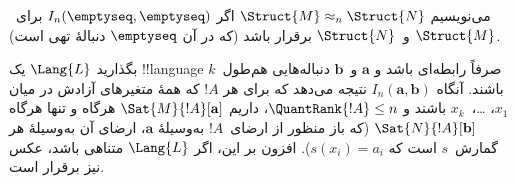 \documentclass[../../../include/open-logic-section]{subfiles}
\begin{document}
\begin{defn}
  می‌نویسیم $\Struct{M} \approx_n \Struct{N}$ اگر
  $I_n(\emptyseq,\emptyseq)$ برای~$\Struct{M}$ و~$\Struct{N}$ برقرار
  باشد (که در آن $\emptyseq$ دنبالهٔ تهی است).
\end{defn}

\begin{thm}
  بگذارید $\Lang{L}$ یک !!{language} صرفاً رابطه‌ای باشد و
  $\mathbf a$ و~$\mathbf b$ دنباله‌هایی هم‌طول~$k$ باشند. آنگاه
  $I_n (\mathbf{a},\mathbf{b})$ نتیجه می‌دهد که برای هر $!A$ که همهٔ
  متغیرهای آزادش در میان $x_1$، \dots،~$x_k$ باشند و
  $\QuantRank{!A} \le n$، داریم $\Sat{M}{!A}[\mathbf{a}]$ هرگاه و تنها
  هرگاه $\Sat{N}{!A}[\mathbf{b}]$ (که باز منظور از ارضای~$!A$ به‌وسیلهٔ
  $\mathbf{a}$، ارضای آن به‌وسیلهٔ هر گمارش~$s$ است که
  $s(x_i) = a_i$). افزون بر این، اگر $\Lang{L}$ متناهی باشد، عکس نیز
  برقرار است.
\end{thm}
\end{document}
